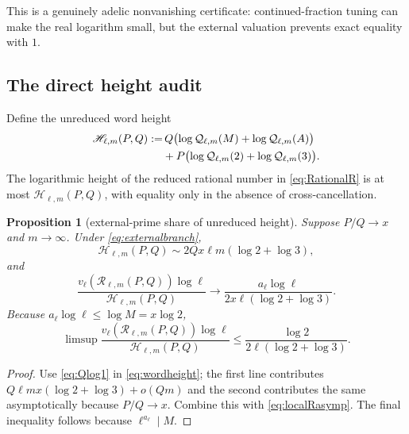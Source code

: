 \documentclass[11pt]{article}
\numberwithin{equation}{section}
\newtheorem{proposition}[theorem]{Proposition}
\theoremstyle{definition}
\theoremstyle{remark}
\begin{document}
This is a genuinely adelic nonvanishing certificate: continued-fraction tuning can make the real logarithm small, but the external valuation prevents exact equality with $1$.

\subsection{The direct height audit}

Define the unreduced word height
\begin{align}
  \mathscr H_{\ell,m}(P,Q)
  :=&\,Q\bigl(\log\mathcal Q_{\ell,m}(M)
              +\log\mathcal Q_{\ell,m}(A)\bigr)\notag\\
     &+P\bigl(\log\mathcal Q_{\ell,m}(2)
              +\log\mathcal Q_{\ell,m}(3)\bigr).
  \label{eq:wordheight}
\end{align}
The logarithmic height of the reduced rational number in \eqref{eq:RationalR} is at most $\mathscr H_{\ell,m}(P,Q)$, with equality only in the absence of cross-cancellation.

\begin{proposition}[external-prime share of unreduced height]\label{prop:heightshare}
Suppose $P/Q\to x$ and $m\to\infty$.  Under \eqref{eq:externalbranch},
\begin{equation}\label{eq:wordheightasymp}
  \mathscr H_{\ell,m}(P,Q)
  \sim 2Qx\ell m(\log2+\log3),
\end{equation}
and
\begin{equation}\label{eq:heightsharelimit}
  \frac{v_\ell(\mathscr R_{\ell,m}(P,Q))\log\ell}
       {\mathscr H_{\ell,m}(P,Q)}
  \longrightarrow
  \frac{a_\ell\log\ell}
       {2x\ell(\log2+\log3)}.
\end{equation}
Because $a_\ell\log\ell\le\log M=x\log2$,
\begin{equation}\label{eq:heightshareceiling}
  \limsup
  \frac{v_\ell(\mathscr R_{\ell,m}(P,Q))\log\ell}
       {\mathscr H_{\ell,m}(P,Q)}
  \le
  \frac{\log2}{2\ell(\log2+\log3)}.
\end{equation}
\end{proposition}

\begin{proof}
Use \eqref{eq:Qlog1} in \eqref{eq:wordheight}; the first line contributes
$Q\ell m x(\log2+\log3)+o(Qm)$ and the second contributes the same asymptotically because $P/Q\to x$.  Combine this with \eqref{eq:localRasymp}.  The final inequality follows because $\ell^{a_\ell}\mid M$.
\end{proof}
\end{document}
